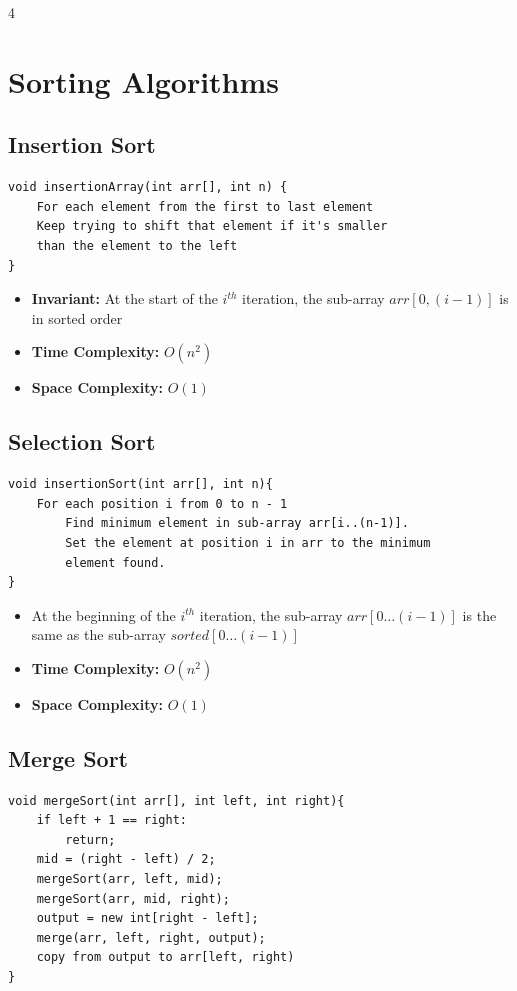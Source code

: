 \documentclass[fontsize=6pt, landscape, a4paper]{scrartcl}
\begin{document}
\begin{multicols*}{4}
    \section*{Sorting Algorithms}
    \subsection*{Insertion Sort}
    \begin{lstlisting}
void insertionArray(int arr[], int n) {
    For each element from the first to last element
    Keep trying to shift that element if it's smaller
    than the element to the left
}
\end{lstlisting}

    \begin{itemize}
        \item \textbf{Invariant:} At the start of the $i^{th}$ iteration, the sub-array $arr[0, (i - 1)]$ is in sorted order
        \item \textbf{Time Complexity:} $O(n^{2})$
        \item \textbf{Space Complexity:} $O(1)$
    \end{itemize}

    \subsection*{Selection Sort}
    \begin{lstlisting}
void insertionSort(int arr[], int n){
    For each position i from 0 to n - 1
        Find minimum element in sub-array arr[i..(n-1)].
        Set the element at position i in arr to the minimum
        element found.
}

\end{lstlisting}

    \begin{itemize}
        \item At the beginning of the $i^{th}$ iteration, the sub-array $arr[0 \dots (i-1)]$
              is the same as the sub-array $sorted[0 \dots (i-1)]$
        \item \textbf{Time Complexity:} $O(n^{2})$
        \item \textbf{Space Complexity:} $O(1)$
    \end{itemize}

    \subsection*{Merge Sort}
    \begin{lstlisting}
void mergeSort(int arr[], int left, int right){
    if left + 1 == right:
        return;
    mid = (right - left) / 2;
    mergeSort(arr, left, mid);
    mergeSort(arr, mid, right);
    output = new int[right - left];
    merge(arr, left, right, output);
    copy from output to arr[left, right)
}


\end{lstlisting}
\end{multicols*}
\end{document}
